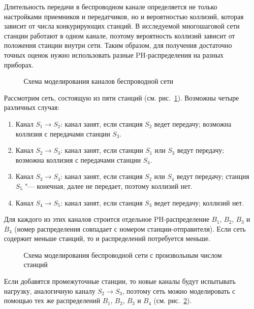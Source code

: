 Длительность передачи в беспроводном канале определяется не только настройками приемников и передатчиков, но и вероятностью коллизий, которая зависит от числа конкурирующих станций. В исследуемой многошаговой сети станции работают в одном канале, поэтому вероятность коллизий зависит от положения станции внутри сети. Таким образом, для получения достаточно точных оценок нужно использовать разные PH-распределения на разных приборах.

\begin{figure}[h]
  \caption{Схема моделирования каналов беспроводной сети}
  \label{fig:ch4_channel_model_schema}
\end{figure}

Рассмотрим сеть, состоящую из пяти станций (см. рис.~\ref{fig:ch4_channel_model_schema}). Возможны четыре различных случая:

\begin{enumerate}
  \item Канал $S_1 \rightarrow S_2$: канал занят, если станция $S_2$ ведет передачу; возможна коллизия с передачами станции $S_3$.
  \item Канал $S_2 \rightarrow S_3$: канал занят, если станции $S_1$ или $S_3$ ведут передачу; возможна коллизия с передачами станции $S_4$.
  \item Канал $S_3 \rightarrow S_4$: канал занят, если станция $S_2$ или $S_4$ ведут передачу; станция $S_5$ "--- конечная, далее не передает, поэтому коллизий нет.
  \item Канал $S_4 \rightarrow S_5$: канал занят, если станция $S_3$ ведет передачу; коллизий нет.
\end{enumerate}

Для каждого из этих каналов строится отдельное PH-распределение $B_1$, $B_2$, $B_3$ и $B_4$ (номер распределения совпадает с номером станции-отправителя). Если сеть содержит меньше станций, то и распределений потребуется меньше.

\begin{figure}[h]
  \caption{Схема моделирования беспроводной сети с произвольным числом станций}
  \label{fig:ch4_network_model_schema}
\end{figure}

Если добавятся промежуточные станции, то новые каналы будут испытывать нагрузку, аналогичную каналу $S_2 \rightarrow S_3$, поэтому сеть можно моделировать с помощью тех же распределений $B_1$, $B_2$, $B_3$ и $B_4$ (см. рис.~\ref{fig:ch4_network_model_schema}).



